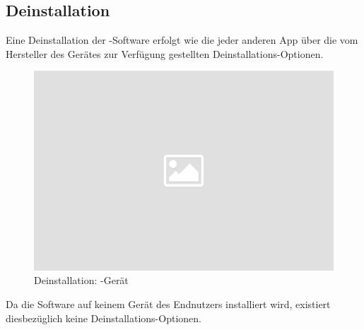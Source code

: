 \subsection{Deinstallation}

\noindent
Eine Deinstallation der \cli-Software erfolgt wie die jeder anderen App über
die vom Hersteller des Gerätes zur Verfügung gestellten Deinstallations-Optionen.\\[.1cm]

\noindent
\begin{figure}[ht]
	\centering
  \includegraphics[width=16cm]{pictures/placeholder.png}
	\caption{Deinstallation: \cli-Gerät}
	\label{pic/deinstall}
\end{figure}

\noindent
Da die \ser Software auf keinem Gerät des Endnutzers installiert wird, existiert
diesbezüglich keine Deinstallations-Optionen.\\[.1cm]
